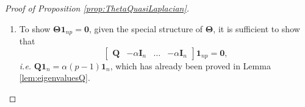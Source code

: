 \documentclass[12pt]{article}
\theoremstyle{plain}
\theoremstyle{remark}
\newcommand{\round}[1]{\left( #1 \right)}
\newcommand{\onen}[0]{{\mathbf{1}_{n}}}
\newcommand{\ie}{\textit{i.e. }}
\newcommand{\dVec}[1]{{\bm{#1}}}            %
\newcommand{\latMatr}[1]{\mathbf{#1}}          %
\newcommand{\grMatr}[1]{{\boldsymbol{#1}}}   %
\newcommand{\tobi}[1]{\textcolor{teal}{#1}}
\begin{document}
\begin{proof}[Proof of Proposition \ref{prop:ThetaQuasiLaplacian}]
\begin{enumerate}
\begin{align*}
\begin{bmatrix}
                    p\\
                    0\\
                    \vdots\\
                    0
                \end{bmatrix}\otimes \begin{bmatrix}
                    -\alpha \\
                    \vdots \\
                    -\alpha
                \end{bmatrix}\geq -\alpha p.
            \end{align*}
            Therefore $\grMatr{\Theta}$ is positive semidefinite.
            \item To show $\grMatr{\Theta} \dVec{1}_{np} = \dVec 0$, given the special structure of $\grMatr{\Theta}$, it is sufficient to show that 
            \begin{equation*}
                \begin{bmatrix}
                    \latMatr{Q} & -\alpha \latMatr{I}_n & \dots & -\alpha \latMatr{I}_n
                \end{bmatrix} \mathbf{1}_{np} = \dVec 0,
            \end{equation*}
            \ie $\latMatr{Q} \onen = \alpha (p-1) \onen$, {which has already been proved in Lemma \ref{lem:eigenvaluesQ}}. %

\end{enumerate}
\end{proof}
\end{document}
